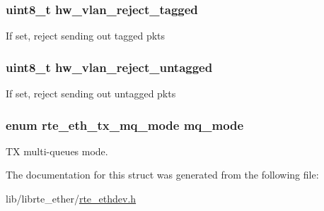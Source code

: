 \subsubsection[{hw\+\_\+vlan\+\_\+reject\+\_\+tagged}]{\setlength{\rightskip}{0pt plus 5cm}uint8\+\_\+t hw\+\_\+vlan\+\_\+reject\+\_\+tagged}\label{structrte__eth__txmode_a6ebd244447cda58041fde4872262b10b}
If set, reject sending out tagged pkts \hypertarget{structrte__eth__txmode_a7b631a6c385c85f9a5f90895b2175126}{}
\subsubsection[{hw\+\_\+vlan\+\_\+reject\+\_\+untagged}]{\setlength{\rightskip}{0pt plus 5cm}uint8\+\_\+t hw\+\_\+vlan\+\_\+reject\+\_\+untagged}\label{structrte__eth__txmode_a7b631a6c385c85f9a5f90895b2175126}
If set, reject sending out untagged pkts \hypertarget{structrte__eth__txmode_aac4d1eaef063383b937a1d568412b4ce}{}
\subsubsection[{mq\+\_\+mode}]{\setlength{\rightskip}{0pt plus 5cm}enum {\bf rte\+\_\+eth\+\_\+tx\+\_\+mq\+\_\+mode} mq\+\_\+mode}\label{structrte__eth__txmode_aac4d1eaef063383b937a1d568412b4ce}
T\+X multi-\/queues mode. 

The documentation for this struct was generated from the following file\+:\begin{DoxyCompactItemize}
\item 
lib/librte\+\_\+ether/\hyperlink{rte__ethdev_8h}{rte\+\_\+ethdev.\+h}\end{DoxyCompactItemize}
